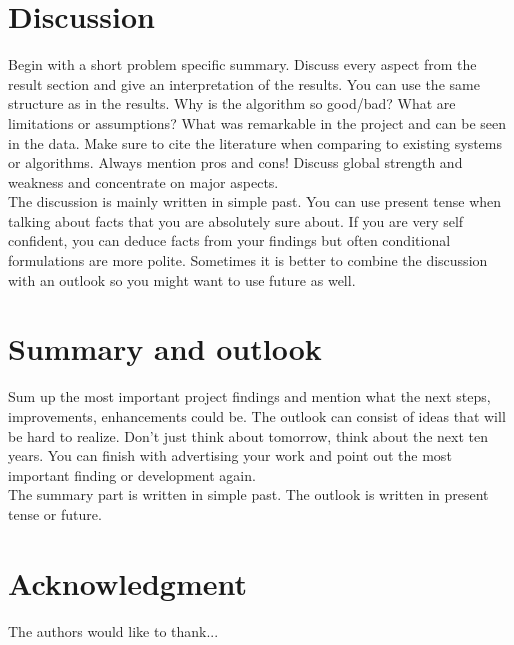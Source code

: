 \documentclass[conference]{IEEEtran}
\begin{document}
\section{Discussion}
Begin with a short problem specific summary. Discuss every aspect from the result section and give an interpretation of the results. You can use the same structure as in the results. Why is the algorithm so good/bad? What are limitations or assumptions? What was remarkable in the project and can be seen in the data. Make sure to cite the literature when comparing to existing systems or algorithms. Always mention pros and cons! Discuss global strength and weakness and concentrate on major aspects.\\
The discussion is mainly written in simple past. You can use present tense when talking about facts that you are absolutely sure about. If you are very self confident, you can deduce facts from your findings but often conditional formulations are more polite. Sometimes it is better to combine the discussion with an outlook so you might want to use future as well. 
 
\section{Summary and outlook}
Sum up the most important project findings and mention what the next steps, improvements, enhancements could be. The outlook can consist of ideas that will be hard to realize. Don't just think about tomorrow, think about the next ten years. You can finish with advertising your work and point out the most important finding or development again.\\
The summary part is written in simple past. The outlook is written in present tense or future.




\section*{Acknowledgment}


The authors would like to thank...
\end{document}

